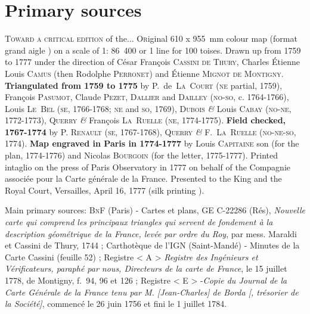 \documentclass[portrait, A0]{sciposter}
\begin{document}
\begin{minipage}[b]{77cm}
\section{Primary sources}
\begin{multicols}{3}
\setlength{\columnsep}{80pt}

\textsc{Toward a critical edition} \small{of the...}
\vfill
\normalsize
\lettrine{O}riginal 610 x 955~mm colour map (format \og grand aigle \fg) on a scale of 1: 86~400 or 1 line for 100 toises. Drawn up from 1759 to 1777 under the direction of César François \textsc{Cassini de Thury}, Charles Étienne Louis \textsc{Camus} (then Rodolphe \textsc{Perronet}) and Étienne \textsc{Mignot de Montigny}. \textbf{Triangulated from 1759 to 1775} by P.~de~\textsc{La~Court} (\textsc{ne} partial, 1759), François \textsc{Pasumot}, Claude \textsc{Pezet}, \textsc{Dallier} and \textsc{Dailley} (\textsc{no-so}, c. 1764-1766), Louis \textsc{Le~Bel} (\textsc{se}, 1766-1768; \textsc{ne} and \textsc{so}, 1769), \textsc{Dubois} \textit{\&} Louis \textsc{Cabay} (\textsc{no-ne}, 1772-1773), Q\textsc{uerry} \textit{\&} François \textsc{La~Ruelle} (\textsc{ne}, 1774-1775). \textbf{Field checked, 1767-1774} by P. \textsc{Renault} (\textsc{se}, 1767-1768), Q\textsc{uerry} \textit{\&} F.~\textsc{La~Ruelle} (\textsc{no-ne-so}, 1774). \textbf{Map engraved in Paris in 1774-1777} by Louis \textsc{Capitaine} son (for the plan, 1774-1776) and Nicolas \textsc{Bourgoin} (for the letter, 1775-1777). Printed intaglio on the press of Paris Observatory in 1777 on behalf of the Compagnie associée pour la Carte générale de la France. Presented to the King and the Royal Court, Versailles, April 16, 1777 (\og silk printing \fg).\\
\vfill


\scriptsize Main primary sources: \textsc{BnF} (Paris) - Cartes et plans, GE C-22286 (Rés), \textit{Nouvelle carte qui comprend les principaux triangles qui servent de fondement à la description géométrique de la France, levée par ordre du Roy}, par mess. Maraldi et Cassini de Thury, 1744 ; Carthotèque de l'IGN (Saint-Mandé) - Minutes de la Carte Cassini (feuille 52) ; Registre < A > \textit{Registre des Ingénieurs et Vérificateurs, paraphé par nous, Directeurs de la carte de France}, le 15 juillet 1778, de Montigny, f.~94, 96 et 126 ; Registre  < E > -\textit{Copie du Journal de la Carte Générale de la France tenu par M. [Jean-Charles] de Borda [, trésorier de la Société]}, commencé le 26 juin 1756 et fini le 1 juillet 1784.


\end{multicols}
\end{minipage}
\end{document}
